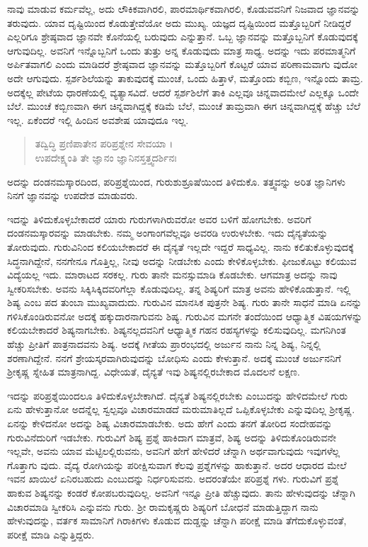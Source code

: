 ನಾವು ಮಾಡುವ ಕರ್ಮವೆಲ್ಲ, ಅದು ಲೌಕಿಕವಾಗಿರಲಿ, ಪಾರಮಾರ್ಥಿಕವಾಗಿರಲಿ, ಕೊಡುವವನಿಗೆ ನಿಜವಾದ ಜ್ಞಾನವನ್ನು ತರುವುದು. ಯಾವ ದೃಷ್ಟಿಯಿಂದ ಕೊಡುತ್ತೇವೆಯೋ ಅದು ಮುಖ್ಯ. ಯಜ್ಞದ ದೃಷ್ಟಿಯಿಂದ ಮತ್ತೊಬ್ಬರಿಗೆ ನೀಡಿದ್ದರೆ ಎಲ್ಲರಿಗೂ ಶ್ರೇಷ್ಠವಾದ ಜ್ಞಾನವೇ ಕೊನೆಯಲ್ಲಿ ಬರುವುದು ಎನ್ನುತ್ತಾನೆ. ಒಬ್ಬ ಜ್ಞಾನವನ್ನು ಮತ್ತೊಬ್ಬನಿಗೆ ಕೊಡುವುದಕ್ಕೆ ಆಗುವುದಿಲ್ಲ. ಅವನಿಗೆ ಇನ್ನೊಬ್ಬನಿಗೆ ಒಂದು ತುತ್ತು ಅನ್ನ ಕೊಡುವುದು ಮಾತ್ರ ಸಾಧ್ಯ. ಅದನ್ನು ಇದು ಪರಮಾತ್ಮನಿಗೆ ಅರ್ಪಿತವಾಗಲಿ ಎಂದು ಮಾಡಿದರೆ ಶ್ರೇಷ್ಠವಾದ ಜ್ಞಾನವನ್ನು ಮತ್ತೊಬ್ಬರಿಗೆ ಕೊಟ್ಟರೆ ಯಾವ ಪರಿಣಾಮವಾಗು ವುದೋ ಅದೇ ಆಗುವುದು. ಸ್ಪರ್ಶಶಿಲೆಯನ್ನು ತಾಕುವುದಕ್ಕೆ ಮುಂಚೆ, ಒಂದು ಹಿತ್ತಾಳೆ, ಮತ್ತೊಂದು ಕಬ್ಬಿಣ, ಇನ್ನೊಂದು ತಾಮ್ರ. ಅದಕ್ಕೆಲ್ಲ ಪೇಟೆಯ ಧಾರಣೆಯಲ್ಲಿ ವ್ಯತ್ಯಾಸವಿದೆ. ಆದರೆ ಸ್ಪರ್ಶಶಿಲೆಗೆ ತಾಕಿ ಎಲ್ಲವೂ ಚಿನ್ನವಾದಮೇಲೆ ಎಲ್ಲಕ್ಕೂ ಒಂದೇ ಬೆಲೆ. ಮುಂಚೆ ಕಬ್ಬಿಣವಾಗಿ ಈಗ ಚಿನ್ನವಾಗಿದ್ದಕ್ಕೆ ಕಡಿಮೆ ಬೆಲೆ, ಮುಂಚೆ ತಾಮ್ರವಾಗಿ ಈಗ ಚಿನ್ನವಾಗಿದ್ದಕ್ಕೆ ಹೆಚ್ಚು ಬೆಲೆ ಇಲ್ಲ. ಏಕೆಂದರೆ ಇಲ್ಲಿ ಹಿಂದಿನ ಅವಶೇಷ ಯಾವುದೂ ಇಲ್ಲ.

\begin{verse}
ತದ್ವಿದ್ಧಿ ಪ್ರಣಿಪಾತೇನ ಪರಿಪ್ರಶ್ನೇನ ಸೇವಯಾ ।\\ಉಪದೇಕ್ಷ್ಯಂತಿ ತೇ ಜ್ಞಾನಂ ಜ್ಞಾನಿನಸ್ತತ್ತ್ವದರ್ಶಿನಃ 
\end{verse}

{\small ಅದನ್ನು ದಂಡನಮಸ್ಕಾರದಿಂದ, ಪರಿಪ್ರಶ್ನೆಯಿಂದ, ಗುರುಶುಶ್ರೂಷೆಯಿಂದ ತಿಳಿದುಕೊ. ತತ್ತ್ವವನ್ನು ಅರಿತ ಜ್ಞಾನಿಗಳು ನಿನಗೆ ಜ್ಞಾನವನ್ನು ಉಪದೇಶ ಮಾಡುವರು.}

ಇದನ್ನು ತಿಳಿದುಕೊಳ್ಳಬೇಕಾದರೆ ಯಾರು ಗುರುಗಳಾಗಿರುವರೋ ಅವರ ಬಳಿಗೆ ಹೋಗಬೇಕು. ಅವರಿಗೆ ದಂಡನಮಸ್ಕಾರವನ್ನು ಮಾಡಬೇಕು. ನಮ್ಮ ಅಂಗಾಂಗವೆಲ್ಲವೂ ಅವರಡಿ ಉರುಳಬೇಕು. ಇದು ದೈನ್ಯತೆಯನ್ನು ತೋರುವುದು. ಗುರುವಿನಿಂದ ಕಲಿಯಬೇಕಾದರೆ ಈ ದೈನ್ಯತೆ ಇಲ್ಲದೇ ಇದ್ದರೆ ಸಾಧ್ಯವಿಲ್ಲ. ನಾನು ಕಲಿತುಕೊಳ್ಳುವುದಕ್ಕೆ ಸಿದ್ಧನಾಗಿದ್ದೇನೆ, ನನಗೇನೂ ಗೊತ್ತಿಲ್ಲ, ನೀವು ಅದನ್ನು ನೀಡಬೇಕು ಎಂದು ಕೇಳಿಕೊಳ್ಳಬೇಕು. ಫೀಜುಕೊಟ್ಟು ಕಲಿಯುವ ವಿದ್ಯೆಯಲ್ಲ ಇದು. ಮಾರಾಟದ ಸರಕಲ್ಲ. ಗುರು ತಾನೇ ಮನಸ್ಸುಮಾಡಿ ಕೊಡಬೇಕು. ಆಗಮಾತ್ರ ಅದನ್ನು ನಾವು ಸ್ವೀಕರಿಸಬೇಕು. ಅವನು ಸಿಕ್ಕಿಸಿಕ್ಕಿದವರಿಗೆಲ್ಲಾ ಕೊಡುವುದಿಲ್ಲ. ತನ್ನ ಶಿಷ್ಯರಿಗೆ ಮಾತ್ರ ಅವನು ಹೇಳಿಕೊಡುತ್ತಾನೆ. ಇಲ್ಲಿ ಶಿಷ್ಯ ಎಂಬ ಪದ ತುಂಬಾ ಮುಖ್ಯವಾದುದು. ಗುರುವಿನ ಮಾನಸಿಕ ಪುತ್ರನೇ ಶಿಷ್ಯ. ಗುರು ತಾನೇ ಸಾಧನೆ ಮಾಡಿ ಏನನ್ನು ಗಳಿಸಿಕೊಂಡಿರುವನೋ ಅದಕ್ಕೆ ಹಕ್ಕುದಾರನಾಗುವನು ಶಿಷ್ಯ. ಗುರುವಿನ ಮಗನೇ ತಂದೆಯಿಂದ ಆಧ್ಯಾತ್ಮಿಕ ವಿಷಯಗಳನ್ನು ಕಲಿಯಬೇಕಾದರೆ ಶಿಷ್ಯನಾಗಬೇಕು. ಶಿಷ್ಯನಲ್ಲದವನಿಗೆ ಆಧ್ಯಾತ್ಮಿಕ ಗಹನ ರಹಸ್ಯಗಳನ್ನು ಕಲಿಸುವುದಿಲ್ಲ. ಮಗನಿಗಿಂತ ಹೆಚ್ಚು ಪ್ರೀತಿಗೆ ಪಾತ್ರನಾದವನು ಶಿಷ್ಯ. ಅದಕ್ಕೆ ಗೀತೆಯ ಪ್ರಾರಂಭದಲ್ಲಿ ಅರ್ಜುನ ನಾನು ನಿನ್ನ ಶಿಷ್ಯ, ನಿನ್ನಲ್ಲಿ ಶರಣಾಗಿದ್ದೇನೆ. ನನಗೆ ಶ್ರೇಯಸ್ಕರವಾಗಿರುವುದನ್ನು ಬೋಧಿಸು ಎಂದು ಕೇಳುತ್ತಾನೆ. ಅದಕ್ಕೆ ಮುಂಚೆ ಅರ್ಜುನನಿಗೆ ಶ್ರೀಕೃಷ್ಣ ಸ್ನೇಹಿತ ಮಾತ್ರನಾಗಿದ್ದ. ವಿಧೇಯತೆ, ದೈನ್ಯತೆ ಇವು ಶಿಷ್ಯನಲ್ಲಿರಬೇಕಾದ ಮೊದಲನೆ ಲಕ್ಷಣ.

ಇದನ್ನು ಪರಿಪ್ರಶ್ನೆಯಿಂದಲೂ ತಿಳಿದುಕೊಳ್ಳಬೇಕಾಗಿದೆ. ದೈನ್ಯತೆ ಶಿಷ್ಯನಲ್ಲಿರಬೇಕು ಎಂಬುದನ್ನು ಹೇಳಿದಮೇಲೆ ಗುರು ಏನು ಹೇಳುತ್ತಾನೋ ಅದನ್ನೆಲ್ಲ ಸ್ವಲ್ಪವೂ ವಿಚಾರಮಾಡದೆ ಮರುಮಾತಿಲ್ಲದೆ ಒಪ್ಪಿಕೊಳ್ಳಬೇಕು ಎನ್ನುವುದಿಲ್ಲ ಶ್ರೀಕೃಷ್ಣ. ಏನನ್ನು ಕೇಳಿದನೋ ಅದನ್ನು ಶಿಷ್ಯ ವಿಚಾರಮಾಡಬೇಕು. ಅದು ಹೇಗೆ ಎಂದು ತನಗೆ ತೋರಿದ ಸಂದೇಹವನ್ನು ಗುರುವಿನೆದುರಿಗೆ ಇಡಬೇಕು. ಗುರುವಿಗೆ ಶಿಷ್ಯ ಪ್ರಶ್ನೆ ಹಾಕಿದಾಗ ಮಾತ್ರವೆ, ಶಿಷ್ಯ ಅದನ್ನು ತಿಳಿದುಕೊಂಡಿರುವನೇ ಇಲ್ಲವೇ, ಅವನು ಯಾವ ಮೆಟ್ಟಿಲಲ್ಲಿರುವನು, ಅವನಿಗೆ ಹೇಗೆ ಹೇಳಿದರೆ ಚೆನ್ನಾಗಿ ಅರ್ಥವಾಗುವುದು ಇವುಗಳೆಲ್ಲ ಗೊತ್ತಾಗು ವುದು. ವೈದ್ಯ ರೋಗಿಯನ್ನು ಪರೀಕ್ಷಿಸುವಾಗ ಕೆಲವು ಪ್ರಶ್ನೆಗಳನ್ನು ಹಾಕುತ್ತಾನೆ. ಅದರ ಆಧಾರದ ಮೇಲೆ ಇವನ ಖಾಯಿಲೆ ಏನಿರಬಹುದು ಎಂಬುದನ್ನು ನಿರ್ಧರಿಸುವನು. ಅದರಂತೆಯೇ ಪರಿಪ್ರಶ್ನೆ ಗಳು. ಗುರುವಿಗೆ ಪ್ರಶ್ನೆ ಹಾಕುವ ಶಿಷ್ಯನನ್ನು ಕಂಡರೆ ಕೋಪಬರುವುದಿಲ್ಲ. ಅವನಿಗೆ ಇನ್ನೂ ಪ್ರೀತಿ ಹೆಚ್ಚುವುದು. ತಾನು ಹೇಳುವುದನ್ನು ಚೆನ್ನಾಗಿ ವಿಚಾರಮಾಡಿ ಸ್ವೀಕರಿಸಿ ಎನ್ನುವನು ಗುರು. ಶ್ರೀ ರಾಮಕೃಷ್ಣರು ಶಿಷ್ಯರಿಗೆ ಬೋಧನೆ ಮಾಡುತ್ತಿದ್ದಾಗ ನಾನು ಹೇಳುವುದನ್ನು, ವರ್ತಕ ಸಾಮಾನಿಗೆ ಗಿರಾಕಿಗಳು ಕೊಡುವ ದುಡ್ಡನ್ನು ಚೆನ್ನಾಗಿ ಪರೀಕ್ಷೆ ಮಾಡಿ ತೆಗೆದುಕೊಳ್ಳುವಂತೆ, ಪರೀಕ್ಷೆ ಮಾಡಿ ಎನ್ನುತ್ತಿದ್ದರು.

